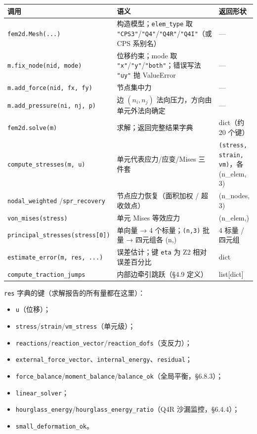 \documentclass[12pt,a4paper]{ctexart}
\newcommand{\fem}{\Verb}
\begin{document}
\begin{center}\small
\begin{tabular}{p{4.9cm}p{7.0cm}p{2.8cm}}
\textbf{调用} & \textbf{语义} & \textbf{返回形状} \\ \hline
\fem|fem2d.Mesh(...)| &
构造模型；\fem|elem_type| 取 \fem|"CPS3"|/\fem|"Q4"|/\fem|"Q4R"|/\fem|"Q4I"|（或 CPS 系别名） &
--- \\
\fem|m.fix_node(nid, mode)| & 位移约束；mode 取 \fem|"x"|/\fem|"y"|/\fem|"both"|；错误写法 \fem|"uy"| 抛 ValueError &
--- \\
\fem|m.add_force(nid, fx, fy)| & 节点集中力 &
--- \\
\fem|m.add_pressure(ni, nj, p)| & 边 $(n_i,n_j)$ 法向压力，方向由单元外法向确定 &
--- \\
\fem|fem2d.solve(m)| & 求解；返回完整结果字典 &
dict（约 20 个键） \\
\fem|compute_stresses(m, u)| & 单元代表应力/应变/Mises 三件套 &
\texttt{(stress, strain, vm)}，各 (n\_elem, 3) \\
\fem|nodal_weighted| /\newline \fem|spr_recovery| & 节点应力恢复（面积加权 / 超收敛点） &
(n\_nodes, 3) \\
\fem|von_mises(stress)| & 单元 Mises 等效应力 &
(n\_elem,) \\
\texttt{principal\_stresses\newline (stress[0])} & 单向量 → 4 个标量；\fem|(n,3)| 批量 → 四元组各 (n,) &
4 标量 / 四元组 \\
\texttt{estimate\_error\newline (m, res, ...)} & 误差估计；键 \fem|eta| 为 Z2 相对误差百分比 &
dict \\
\texttt{compute\_traction\_\newline jumps} & 内部边牵引跳跃（§4.9 定义） &
list[dict] \\
\end{tabular}
\end{center}

\fem|res| 字典的键（求解报告的所有量都在这里）：
\begin{itemize}[leftmargin=*]
\item \fem|u|（位移）；
\item \fem|stress|/\fem|strain|/\fem|vm_stress|（单元级）；
\item \fem|reactions|/\fem|reaction_vector|/\fem|reaction_dofs|（支反力）；
\item \fem|external_force_vector|、\fem|internal_energy|、\fem|residual|；
\item \fem|force_balance|/\fem|moment_balance|/\fem|balance_ok|（全局平衡，§6.8.3）；
\item \fem|linear_solver|；
\item \fem|hourglass_energy|/\fem|hourglass_energy_ratio|（Q4R 沙漏监控，§6.4.4）；
\item \fem|small_deformation_ok|。
\end{itemize}
\end{document}
